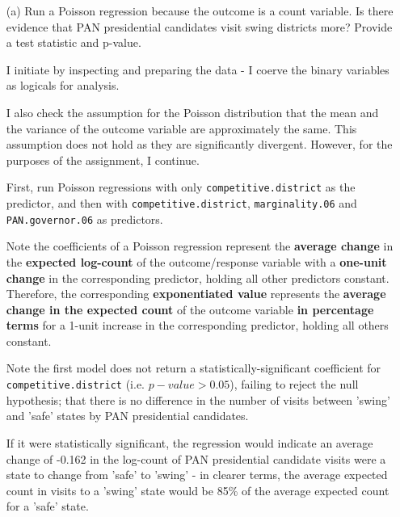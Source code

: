 \documentclass[12pt,letterpaper]{article}
\begin{document}
\begin{enumerate}
	\item [(a)]
	Run a Poisson regression because the outcome is a count variable. Is there evidence that PAN presidential candidates visit swing districts more? Provide a test statistic and p-value.
	
	\noindent I initiate by inspecting and preparing the data - I coerve the binary variables as logicals for analysis.
	
	
	
	\noindent I also check the assumption for the Poisson distribution that the mean and the variance of the outcome variable are approximately the same. This assumption does not hold as they are significantly divergent. However, for the purposes of the assignment, I continue.
	
	
	
	\noindent First, run Poisson regressions with only \texttt{competitive.district} as the predictor, and then with \texttt{competitive.district}, \texttt{marginality.06} and \texttt{PAN.governor.06} as predictors.
	
	
	
	\noindent Note the coefficients of a Poisson regression represent the \textbf{average change} in the \textbf{expected log-count} of the outcome/response variable with a \textbf{one-unit change} in the corresponding predictor, holding all other predictors  constant. Therefore, the corresponding \textbf{exponentiated value} represents the \textbf{average change in the expected count} of the outcome variable \textbf{in percentage terms} for a 1-unit increase in the corresponding predictor, holding all others constant.
	
	\noindent Note the first model does not return a statistically-significant coefficient for \texttt{competitive.district} (i.e. $p-value > 0.05$), failing to reject the null hypothesis; that there is no difference in the number of visits between 'swing' and 'safe' states by PAN presidential candidates.
	
	If it were statistically significant, the regression would indicate an average change of -0.162 in the log-count of PAN presidential candidate visits were a state to change from 'safe' to 'swing' - in clearer terms, the average expected count in visits to a 'swing' state would be 85\% of the average expected count for a 'safe' state.
	

\end{enumerate}
\end{document}
